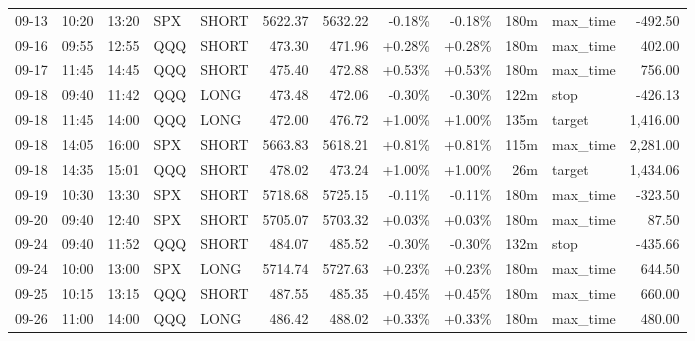 \documentclass[11pt,a4paper,twoside]{article}
\begin{document}
\begin{center}
\begin{longtable}{>{\color{txtmain}}l l l l l r r r r r >{\color{txtmain}}l r}
09-13 & 10:20 & 13:20 & SPX & SHORT & 5622.37 & 5632.22 & \textcolor{lossred}{-0.18\%} & \textcolor{lossred}{-0.18\%} & 180m & max\_time & \textcolor{lossred}{-492.50} \\
09-16 & 09:55 & 12:55 & QQQ & SHORT & 473.30 & 471.96 & \textcolor{wingreen}{+0.28\%} & \textcolor{wingreen}{+0.28\%} & 180m & max\_time & \textcolor{wingreen}{402.00} \\
09-17 & 11:45 & 14:45 & QQQ & SHORT & 475.40 & 472.88 & \textcolor{wingreen}{+0.53\%} & \textcolor{wingreen}{+0.53\%} & 180m & max\_time & \textcolor{wingreen}{756.00} \\
09-18 & 09:40 & 11:42 & QQQ & LONG & 473.48 & 472.06 & \textcolor{lossred}{-0.30\%} & \textcolor{lossred}{-0.30\%} & 122m & stop & \textcolor{lossred}{-426.13} \\
09-18 & 11:45 & 14:00 & QQQ & LONG & 472.00 & 476.72 & \textcolor{wingreen}{+1.00\%} & \textcolor{wingreen}{+1.00\%} & 135m & target & \textcolor{wingreen}{1,416.00} \\
09-18 & 14:05 & 16:00 & SPX & SHORT & 5663.83 & 5618.21 & \textcolor{wingreen}{+0.81\%} & \textcolor{wingreen}{+0.81\%} & 115m & max\_time & \textcolor{wingreen}{2,281.00} \\
09-18 & 14:35 & 15:01 & QQQ & SHORT & 478.02 & 473.24 & \textcolor{wingreen}{+1.00\%} & \textcolor{wingreen}{+1.00\%} & 26m & target & \textcolor{wingreen}{1,434.06} \\
09-19 & 10:30 & 13:30 & SPX & SHORT & 5718.68 & 5725.15 & \textcolor{lossred}{-0.11\%} & \textcolor{lossred}{-0.11\%} & 180m & max\_time & \textcolor{lossred}{-323.50} \\
09-20 & 09:40 & 12:40 & SPX & SHORT & 5705.07 & 5703.32 & \textcolor{wingreen}{+0.03\%} & \textcolor{wingreen}{+0.03\%} & 180m & max\_time & \textcolor{wingreen}{87.50} \\
09-24 & 09:40 & 11:52 & QQQ & SHORT & 484.07 & 485.52 & \textcolor{lossred}{-0.30\%} & \textcolor{lossred}{-0.30\%} & 132m & stop & \textcolor{lossred}{-435.66} \\
09-24 & 10:00 & 13:00 & SPX & LONG & 5714.74 & 5727.63 & \textcolor{wingreen}{+0.23\%} & \textcolor{wingreen}{+0.23\%} & 180m & max\_time & \textcolor{wingreen}{644.50} \\
09-25 & 10:15 & 13:15 & QQQ & SHORT & 487.55 & 485.35 & \textcolor{wingreen}{+0.45\%} & \textcolor{wingreen}{+0.45\%} & 180m & max\_time & \textcolor{wingreen}{660.00} \\
09-26 & 11:00 & 14:00 & QQQ & LONG & 486.42 & 488.02 & \textcolor{wingreen}{+0.33\%} & \textcolor{wingreen}{+0.33\%} & 180m & max\_time & \textcolor{wingreen}{480.00} \\

\end{longtable}
\end{center}
\end{document}
